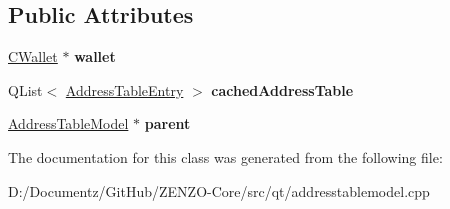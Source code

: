 \subsection*{Public Attributes}
\begin{DoxyCompactItemize}
\item 
\mbox{\label{class_address_table_priv_ad3506d642e5546251e76fbf0d75b2aca}} 
\mbox{\hyperlink{class_c_wallet}{C\+Wallet}} $\ast$ {\bfseries wallet}
\item 
\mbox{\label{class_address_table_priv_a0ef3118dd421927db0ba41e2a27c40c7}} 
Q\+List$<$ \mbox{\hyperlink{struct_address_table_entry}{Address\+Table\+Entry}} $>$ {\bfseries cached\+Address\+Table}
\item 
\mbox{\label{class_address_table_priv_ab0b98e86cab673315860630eafbd6561}} 
\mbox{\hyperlink{class_address_table_model}{Address\+Table\+Model}} $\ast$ {\bfseries parent}
\end{DoxyCompactItemize}


The documentation for this class was generated from the following file\+:\begin{DoxyCompactItemize}
\item 
D\+:/\+Documentz/\+Git\+Hub/\+Z\+E\+N\+Z\+O-\/\+Core/src/qt/addresstablemodel.\+cpp\end{DoxyCompactItemize}
